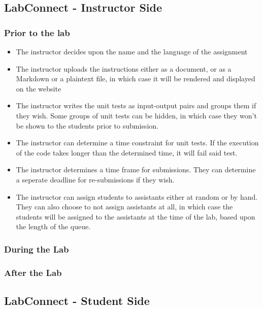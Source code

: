 \documentclass[a4paper, 12pt]{article}
\begin{document}
    \subsection{LabConnect - Instructor Side}

    \subsubsection{Prior to the lab}
    \begin{itemize}
        \item The instructor decides upon the name and the language of the assignment
        \item The instructor uploads the instructions either as a document, or as a Markdown or a plaintext file, in which case it will be rendered and displayed on the website
        \item The instructor writes the unit tests as input-output pairs and groups them if they wish. Some groups of unit tests can be hidden, in which case they won't be shown to the students prior to submission.
        \item The instructor can determine a time constraint for unit tests. If the execution of the code takes longer than the determined time, it will fail said test.
        \item The instructor determines a time frame for submissions. They can determine a seperate deadline for re-submissions if they wish.
        \item The instructor can assign students to assistants either at random or by hand. They can also choose to not assign assistants at all, in which case the students will be assigned to the assistants at the time of the lab, based upon the length of the queue.        
    \end{itemize}
    
    \subsubsection{During the Lab}
    \subsubsection{After the Lab}
    
    \subsection{LabConnect - Student Side}
\end{document}
